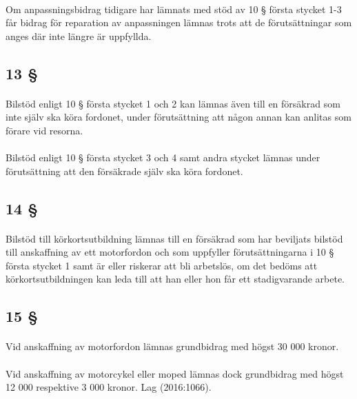 \documentclass[a4paper,notitlepage,openany,10pt]{book}
\begin{document}
\paragraph*{}
Om anpassningsbidrag tidigare har lämnats med stöd av 10 § första stycket 1-3 får bidrag för reparation av anpassningen lämnas trots att de förutsättningar som anges där inte längre är uppfyllda.
\subsection*{13 §}
\paragraph*{}
Bilstöd enligt 10 § första stycket 1 och 2 kan lämnas även till en försäkrad som inte själv ska köra fordonet, under förutsättning att någon annan kan anlitas som förare vid resorna.
\paragraph*{}
Bilstöd enligt 10 § första stycket 3 och 4 samt andra stycket lämnas under förutsättning att den försäkrade själv ska köra fordonet.
\subsection*{14 §}
\paragraph*{}
Bilstöd till körkortsutbildning lämnas till en försäkrad som har beviljats bilstöd till anskaffning av ett motorfordon och som uppfyller förutsättningarna i 10 § första stycket 1 samt är eller riskerar att bli arbetslös, om det bedöms att körkortsutbildningen kan leda till att han eller hon får ett stadigvarande arbete.
\subsection*{15 §}
\paragraph*{}
Vid anskaffning av motorfordon lämnas grundbidrag med högst 30 000 kronor.
\paragraph*{}
Vid anskaffning av motorcykel eller moped lämnas dock grundbidrag med högst 12 000 respektive 3 000 kronor.
Lag (2016:1066).
\end{document}
